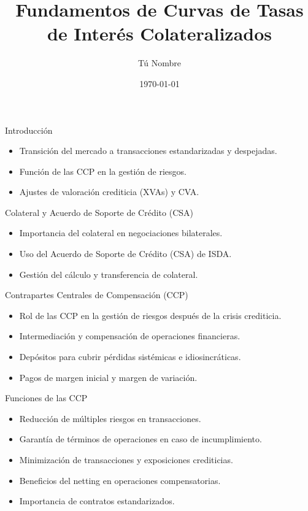 \documentclass{beamer}
\title{Fundamentos de Curvas de Tasas de Interés Colateralizados}
\author{Tú Nombre}
\date{\today}
\begin{document}
	
	\begin{frame}
		\titlepage
	\end{frame}
	
	\begin{frame}{Introducción}
		\begin{itemize}
			\item Transición del mercado a transacciones estandarizadas y despejadas.
			\item Función de las CCP en la gestión de riesgos.
			\item Ajustes de valoración crediticia (XVAs) y CVA.
		\end{itemize}
	\end{frame}
	
	\begin{frame}{Colateral y Acuerdo de Soporte de Crédito (CSA)}
		\begin{itemize}
			\item Importancia del colateral en negociaciones bilaterales.
			\item Uso del Acuerdo de Soporte de Crédito (CSA) de ISDA.
			\item Gestión del cálculo y transferencia de colateral.
		\end{itemize}
	\end{frame}
	
	\begin{frame}{Contrapartes Centrales de Compensación (CCP)}
		\begin{itemize}
			\item Rol de las CCP en la gestión de riesgos después de la crisis crediticia.
			\item Intermediación y compensación de operaciones financieras.
			\item Depósitos para cubrir pérdidas sistémicas e idiosincráticas.
			\item Pagos de margen inicial y margen de variación.
		\end{itemize}
	\end{frame}
	
	\begin{frame}{Funciones de las CCP}
		\begin{itemize}
			\item Reducción de múltiples riesgos en transacciones.
			\item Garantía de términos de operaciones en caso de incumplimiento.
			\item Minimización de transacciones y exposiciones crediticias.
			\item Beneficios del netting en operaciones compensatorias.
			\item Importancia de contratos estandarizados.
		\end{itemize}
	\end{frame}
	
\end{document}
